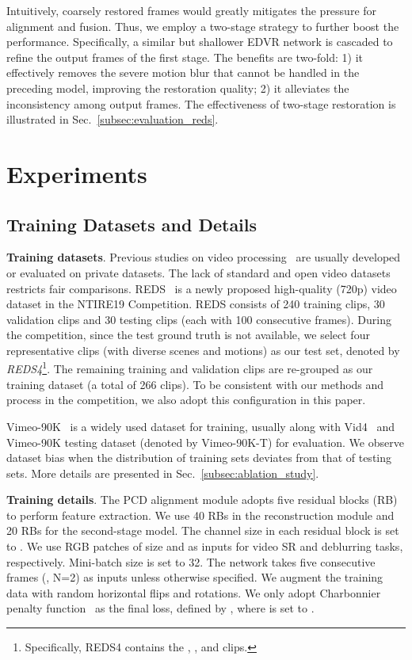 \documentclass[10pt,twocolumn,letterpaper]{article}
\begin{document}
Intuitively, coarsely restored frames would greatly mitigates the pressure for alignment and fusion.
Thus, we employ a two-stage strategy to further boost the performance. Specifically, a similar but shallower EDVR network is cascaded to refine the output frames of the first stage. The benefits are two-fold: 1) it effectively removes the severe motion blur that cannot be handled in the preceding model, improving the restoration quality; 2) it alleviates the inconsistency among output frames.
The effectiveness of two-stage restoration is illustrated in Sec.~\ref{subsec:evaluation_reds}. 

\section{Experiments} \label{sec:experiments}

\subsection{Training Datasets and Details}
\noindent\textbf{Training datasets}.
Previous studies on video processing~\cite{liu2014bayesian,jo2018deep,su2017deep} are usually developed or evaluated on private datasets.
The lack of standard and open video datasets restricts fair comparisons.
REDS~\cite{Nah_2019_CVPR_Workshops_REDS} is a newly proposed high-quality (720p) video dataset in the NTIRE19 Competition. 
REDS consists of 240 training clips, 30 validation clips and 30 testing clips (each with 100 consecutive frames).
During the competition, since the test ground truth is not available, we select four representative clips (with diverse scenes and motions) as our test set, denoted by \textit{REDS4}\footnote{Specifically, REDS4 contains the , ,  and  clips.}. The remaining training and validation clips are re-grouped as our training dataset (a total of 266 clips).
To be consistent with our methods and process in the competition, we also adopt this configuration in this paper.

Vimeo-90K~\cite{xue2017video} is a widely used dataset for training, usually along with Vid4~\cite{liu2014bayesian} and Vimeo-90K testing dataset (denoted by Vimeo-90K-T) for evaluation. We observe dataset bias when the distribution of training sets deviates from that of testing sets. More details are presented in Sec.~\ref{subsec:ablation_study}.

\noindent\textbf{Training details}.
The PCD alignment module adopts five residual blocks (RB) to perform feature extraction. We use 40 RBs in the reconstruction module and 20 RBs for the second-stage model. The channel size in each residual block is set to .
We use RGB patches of size  and  as inputs for video SR and deblurring tasks, respectively. Mini-batch size is set to 32.
The network takes five consecutive frames (\ie, N=2) as inputs unless otherwise specified.
We augment the training data with random horizontal flips and  rotations. We only adopt Charbonnier penalty function~\cite{lai2017deep} as the final loss, defined by , where  is set to .
\end{document}
